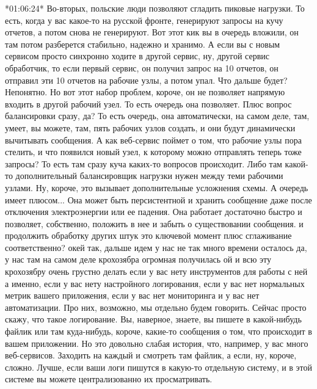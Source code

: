 \documentclass[12pt]{article} %
\begin{document}
*01:06:24*
Во-вторых, польские люди позволяют сгладить пиковые нагрузки. То есть, когда у вас какое-то  на русской фронте, генерируют запросы на кучу отчетов, а потом снова не генерируют.  Вот этот кик вы в очередь вложили, он там потом разберется стабильно, надежно и хранимо.  А если вы с новым сервисом просто синхронно ходите в другой сервис, ну, другой сервис обработчик, то если первый сервис, он получил запрос на 10 отчетов, он отправил эти 10 отчетов на рабочие узлы, а потом упал.  Что дальше будет? Непонятно.  Но вот этот набор проблем, короче, он не позволяет напрямую входить в другой рабочий узел.  То есть очередь она позволяет. Плюс вопрос балансировки сразу, да?  То есть очередь, она автоматически, на самом деле, там, умеет, вы можете, там, пять рабочих узлов создать, и они будут динамически вычитывать сообщения.  А как веб-сервис поймет о том, что рабочие узлы пора стелить, и что появился новый узел, к которому можно отправлять теперь тоже запросы?  То есть там сразу куча каких-то вопросов происходит.  Либо там какой-то дополнительный балансировщик нагрузки нужен между теми рабочими узлами.  Ну, короче, это вызывает дополнительные усложнения схемы.  А очередь имеет плюсом...  Она может быть персистентной и хранить сообщение даже после отключения электроэнергии или ее падения.  Она работает достаточно быстро и позволяет, собственно, положить в нее и забыть о существовании сообщения.  и продолжить обработку других штук это ключевой момент плюс сглаживание соответственно?  окей так, дальше идем у нас не так много времени осталось да, у нас там на самом деле крохозябра огромная получилась ой и всю эту крохозябру очень грустно делать если у вас нету инструментов для работы с ней а именно, если у вас нету настройного логирования, если у вас нет нормальных метрик вашего приложения, если у вас нет мониторинга и у вас нет автоматизации.  Про них, возможно, мы отдельно будем говорить.  Сейчас просто скажу, что такое логирование.  Вы, наверное, знаете, вы пишете в какой-нибудь файлик или там куда-нибудь, короче, какие-то сообщения о том, что происходит в вашем приложении.  Но это довольно слабая история, что, например, у вас много веб-сервисов.  Заходить на каждый и смотреть там файлик, а если, ну, короче, сложно.  Лучше, если ваши логи пишутся в какую-то отдельную систему, и в этой системе вы можете централизованно их просматривать.
\end{document}
